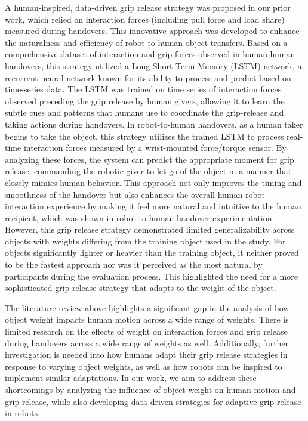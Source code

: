 A human-inspired, data-driven grip release strategy was proposed in our prior work, which relied on interaction forces (including pull force and load share) measured during handovers. This innovative approach was developed to enhance the naturalness and efficiency of robot-to-human object transfers. Based on a comprehensive dataset of interaction and grip forces observed in human-human handovers, this strategy utilized a Long Short-Term Memory (LSTM) network, a  recurrent neural network known for its ability to process and predict based on time-series data.
The LSTM was trained on time series of interaction forces observed preceding the grip release by human givers, allowing it to learn the subtle cues and patterns that humans use to coordinate the grip-release and taking actions during handovers. In robot-to-human handovers, as a human taker begins to take the object, this strategy utilizes the trained LSTM to process real-time interaction forces measured by a wrist-mounted force/torque sensor. By analyzing these forces, the system can predict the appropriate moment for grip release, commanding the robotic giver to let go of the object in a manner that closely mimics human behavior. This approach not only improves the timing and smoothness of the handover but also enhances the overall human-robot interaction experience by making it feel more natural and intuitive to the human recipient, which was shown in robot-to-human handover experimentation. However, this grip release strategy demonstrated limited generalizability across objects with weights differing from the training object used in the study. For objects significantly lighter or heavier than the training object,
it neither proved to be the fastest approach nor was it perceived as the most natural by participants during the evaluation process. This highlighted the need for a more sophisticated grip release strategy that adapts to the weight of the object.

The literature review above highlights a significant gap in the analysis of how object weight impacts human motion across a wide range of weights. There is limited research on the effects of weight on interaction forces and grip release during handovers across a wide range of weights as well. Additionally, further investigation is needed into how humans adapt their grip release strategies in response to varying object weights, as well as how robots can be inspired to implement similar adaptations. In our work, we aim to address these shortcomings by analyzing the influence of object weight on human motion and grip release, while also developing data-driven strategies for adaptive grip release in robots.